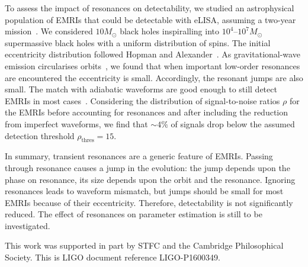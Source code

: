 \documentclass[a4paper]{jpconf}
\begin{document}
To assess the impact of resonances on detectability, we studied an astrophysical population of EMRIs that could be detectable with eLISA, assuming a two-year mission~\cite{Amaro-Seoane2012a}. We considered $10 M_\odot$ black holes inspiralling into $10^4$--$10^7 M_\odot$ supermassive black holes with a uniform distribution of spins. The initial eccentricity distribution followed Hopman and Alexander~\cite{Hopman2005}. As gravitational-wave emission circularises orbits~\cite{Peters1964}, we found that when important low-order resonances are encountered the eccentricity is small. Accordingly, the resonant jumps are also small. The match with adiabatic waveforms are good enough to still detect EMRIs in most cases~\cite{Berry2016a}. Considering the distribution of signal-to-noise ratios $\rho$ for the EMRIs before accounting for resonances and after including the reduction from imperfect waveforms, we find that $\sim4\%$ of signals drop below the assumed detection threshold $\rho_\mathrm{thres} = 15$.



In summary, transient resonances are a generic feature of EMRIs. Passing through resonance causes a jump in the evolution: the jump depends upon the phase on resonance, its size depends upon the orbit and the resonance. Ignoring resonances leads to waveform mismatch, but jumps should be small for most EMRIs because of their eccentricity. Therefore, detectability is not significantly reduced. The effect of resonances on parameter estimation is still to be investigated.

\ack
This work was supported in part by STFC and the Cambridge Philosophical Society. This is LIGO document reference LIGO-P1600349.



\end{document}
